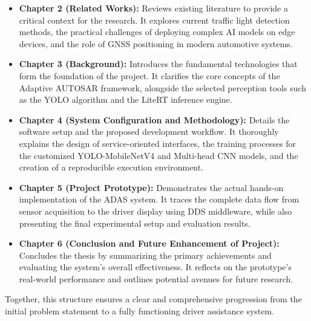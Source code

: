 \begin{itemize}
    \item \textbf{Chapter 2 (Related Works):} Reviews existing literature to provide a critical context for the research. It explores current traffic light detection methods, the practical challenges of deploying complex AI models on edge devices, and the role of GNSS positioning in modern automotive systems.
    
    \item \textbf{Chapter 3 (Background):} Introduces the fundamental technologies that form the foundation of the project. It clarifies the core concepts of the Adaptive AUTOSAR framework, alongside the selected perception tools such as the YOLO algorithm and the LiteRT inference engine.
    
    \item \textbf{Chapter 4 (System Configuration and Methodology):} Details the software setup and the proposed development workflow. It thoroughly explains the design of service-oriented interfaces, the training processes for the customized YOLO-MobileNetV4 and Multi-head CNN models, and the creation of a reproducible execution environment.
    
    \item \textbf{Chapter 5 (Project Prototype):} Demonstrates the actual hands-on implementation of the ADAS system. It traces the complete data flow from sensor acquisition to the driver display using DDS middleware, while also presenting the final experimental setup and evaluation results.
    
    \item \textbf{Chapter 6 (Conclusion and Future Enhancement of Project):} Concludes the thesis by summarizing the primary achievements and evaluating the system's overall effectiveness. It reflects on the prototype's real-world performance and outlines potential avenues for future research.
\end{itemize}

Together, this structure ensures a clear and comprehensive progression from the initial problem statement to a fully functioning driver assistance system.
